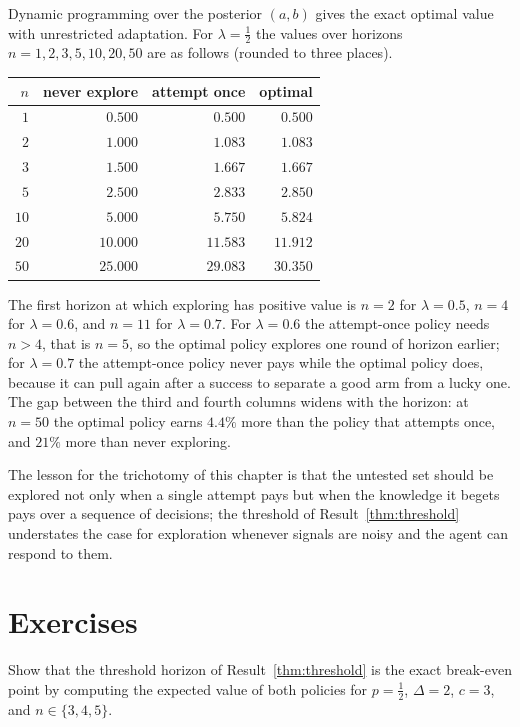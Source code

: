 Dynamic programming over the posterior $(a,b)$ gives the exact optimal value with unrestricted adaptation. For $\lambda=\tfrac12$ the values over horizons $n=1,2,3,5,10,20,50$ are as follows (rounded to three places).
\begin{center}
\begin{tabular}{rrrr}
\toprule
$n$ & never explore & attempt once & optimal\\
\midrule
$1$ & $0.500$ & $0.500$ & $0.500$\\
$2$ & $1.000$ & $1.083$ & $1.083$\\
$3$ & $1.500$ & $1.667$ & $1.667$\\
$5$ & $2.500$ & $2.833$ & $2.850$\\
$10$ & $5.000$ & $5.750$ & $5.824$\\
$20$ & $10.000$ & $11.583$ & $11.912$\\
$50$ & $25.000$ & $29.083$ & $30.350$\\
\bottomrule
\end{tabular}
\end{center}
The first horizon at which exploring has positive value is $n=2$ for $\lambda=0.5$, $n=4$ for $\lambda=0.6$, and $n=11$ for $\lambda=0.7$. For $\lambda=0.6$ the attempt-once policy needs $n>4$, that is $n=5$, so the optimal policy explores one round of horizon earlier; for $\lambda=0.7$ the attempt-once policy never pays while the optimal policy does, because it can pull again after a success to separate a good arm from a lucky one. The gap between the third and fourth columns widens with the horizon: at $n=50$ the optimal policy earns $4.4\%$ more than the policy that attempts once, and $21\%$ more than never exploring.

The lesson for the trichotomy of this chapter is that the untested set should be explored not only when a single attempt pays but when the knowledge it begets pays over a sequence of decisions; the threshold of Result~\ref{thm:threshold} understates the case for exploration whenever signals are noisy and the agent can respond to them.

\section*{Exercises}

\begin{exercise}
Show that the threshold horizon of Result~\ref{thm:threshold} is the exact break-even point by computing the expected value of both policies for $p=\tfrac12$, $\Delta=2$, $c=3$, and $n\in\{3,4,5\}$.
\end{exercise}

